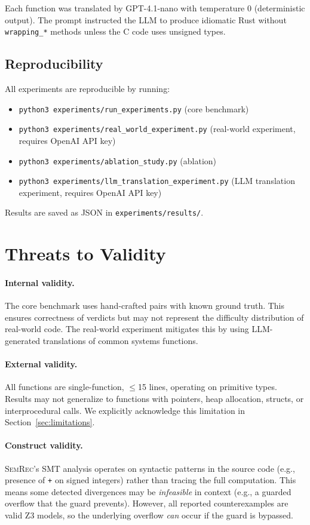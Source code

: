 \documentclass[11pt,a4paper]{article}
\begin{document}
\begin{appendices}
Each function was translated by GPT-4.1-nano with temperature 0
(deterministic output).  The prompt instructed the LLM to produce
idiomatic Rust without \texttt{wrapping\_*} methods unless the C code
uses unsigned types.

\subsection{Reproducibility}

All experiments are reproducible by running:
\begin{itemize}
  \item \texttt{python3 experiments/run\_experiments.py} (core benchmark)
  \item \texttt{python3 experiments/real\_world\_experiment.py}
    (real-world experiment, requires OpenAI API key)
  \item \texttt{python3 experiments/ablation\_study.py} (ablation)
  \item \texttt{python3 experiments/llm\_translation\_experiment.py}
    (LLM translation experiment, requires OpenAI API key)
\end{itemize}

Results are saved as JSON in \texttt{experiments/results/}.


\section{Threats to Validity}\label{app:threats}

\paragraph{Internal validity.}
The core benchmark uses hand-crafted pairs with known ground truth.
This ensures correctness of verdicts but may not represent the
difficulty distribution of real-world code.  The real-world experiment
mitigates this by using LLM-generated translations of common systems
functions.

\paragraph{External validity.}
All functions are single-function, $\leq$15 lines, operating on primitive
types.  Results may not generalize to functions with pointers, heap
allocation, structs, or interprocedural calls.  We explicitly
acknowledge this limitation in Section~\ref{sec:limitations}.

\paragraph{Construct validity.}
\textsc{SemRec}'s SMT analysis operates on syntactic patterns in the
source code (e.g., presence of \texttt{+} on signed integers) rather
than tracing the full computation.  This means some detected divergences
may be \emph{infeasible} in context (e.g., a guarded overflow that
the guard prevents).  However, all reported counterexamples are valid
Z3 models, so the underlying overflow \emph{can} occur if the guard
is bypassed.


\end{appendices}
\end{document}
